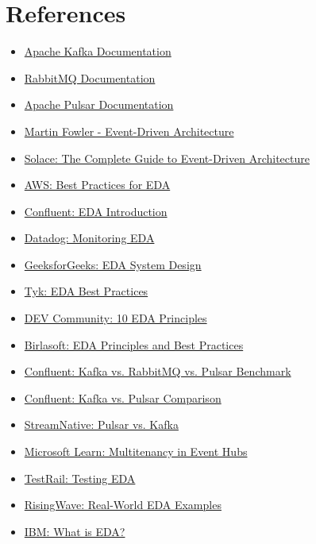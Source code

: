 \documentclass[12pt,a4paper]{report}
\begin{document}
\chapter*{References}
\begin{itemize}
    \item \href{https://kafka.apache.org/documentation/}{Apache Kafka Documentation}\autocite{kafka2025}
    \item \href{https://www.rabbitmq.com/documentation.html}{RabbitMQ Documentation}
    \item \href{https://pulsar.apache.org/docs/}{Apache Pulsar Documentation}
    \item \href{https://martinfowler.com/articles/201701-event-driven.html}{Martin Fowler - Event-Driven Architecture}
    \item \href{https://solace.com/what-is-event-driven-architecture/}{Solace: The Complete Guide to Event-Driven Architecture}
    \item \href{https://aws.amazon.com/blogs/architecture/best-practices-for-implementing-event-driven-architectures-in-your-organization/}{AWS: Best Practices for EDA}
    \item \href{https://www.confluent.io/learn/event-driven-architecture/}{Confluent: EDA Introduction}
    \item \href{https://www.datadoghq.com/blog/monitor-event-driven-architectures/}{Datadog: Monitoring EDA}
    \item \href{https://www.geeksforgeeks.org/system-design/event-driven-architecture-system-design/}{GeeksforGeeks: EDA System Design}
    \item \href{https://tyk.io/learning-center/event-driven-architecture-best-practices/}{Tyk: EDA Best Practices}
    \item \href{https://dev.to/stack-labs/serverless-day-10-principles-for-your-event-driven-architecture-2lb7}{DEV Community: 10 EDA Principles}
    \item \href{https://www.birlasoft.com/articles/embracing-event-driven-architecture-core-principles-patterns-and-best-practices}{Birlasoft: EDA Principles and Best Practices}
    \item \href{https://www.confluent.io/blog/kafka-fastest-messaging-system/}{Confluent: Kafka vs. RabbitMQ vs. Pulsar Benchmark}
    \item \href{https://www.confluent.io/kafka-vs-pulsar/}{Confluent: Kafka vs. Pulsar Comparison}
    \item \href{https://streamnative.io/pulsar/what-is-pulsar}{StreamNative: Pulsar vs. Kafka}
    \item \href{https://learn.microsoft.com/en-us/azure/architecture/guide/multitenant/service/event-hubs}{Microsoft Learn: Multitenancy in Event Hubs}
    \item \href{https://www.testrail.com/blog/event-driven-application-architectures/}{TestRail: Testing EDA}
    \item \href{https://risingwave.com/blog/real-world-applications-of-event-driven-architecture-10-examples/}{RisingWave: Real-World EDA Examples}
    \item \href{https://www.ibm.com/think/topics/event-driven-architecture}{IBM: What is EDA?}
\end{itemize}
\end{document}
